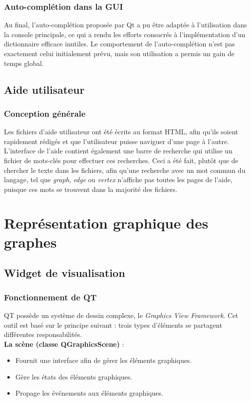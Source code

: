 \documentclass[french]{article}
\begin{document}
			\subsubsection{Auto-complétion dans la GUI}
			Au final, l'auto-complétion proposée par Qt a pu être adaptée à l'utilisation dans la console principale, ce qui a rendu les efforts consacrés à l'implémentation d'un dictionnaire efficace inutiles. Le comportement de l'auto-complétion n'est pas exactement celui initialement prévu, mais son utilisation a permis un gain de temps global.
			
		\subsection{Aide utilisateur}
			\subsubsection{Conception générale}
			Les fichiers d'aide utilisateur ont été écrits au format HTML, afin qu'ils soient rapidement rédigés et que l'utilisateur puisse naviguer d'une page à l'autre. L'interface de l'aide contient également une barre de recherche qui utilise un fichier de mots-clés pour effectuer ces recherches. Ceci a été fait, plutôt que de chercher le texte dans les fichiers, afin qu'une recherche avec un mot commun du langage, tel que \textit{graph}, \textit{edge} ou \textit{vertex} n'affiche pas toutes les pages de l'aide, puisque ces mots se trouvent dans la majorité des fichiers.
	
	\section{Représentation graphique des graphes}
		\subsection{Widget de visualisation}
			\subsubsection{Fonctionnement de QT}
				QT possède un système de dessin complexe, le \textit{Graphics View Framework}. Cet outil est basé sur le principe suivant : trois types d'éléments se partagent différentes responsabilités. \\
				
				\textbf{La scène (classe QGraphicsScene)} :
				\begin{itemize}
					\item Fournit une interface afin de gérer les éléments graphiques.
					\item Gère les états des éléments graphiques.
					\item Propage les événements aux éléments graphiques.
				\end{itemize}
				
\end{document}
